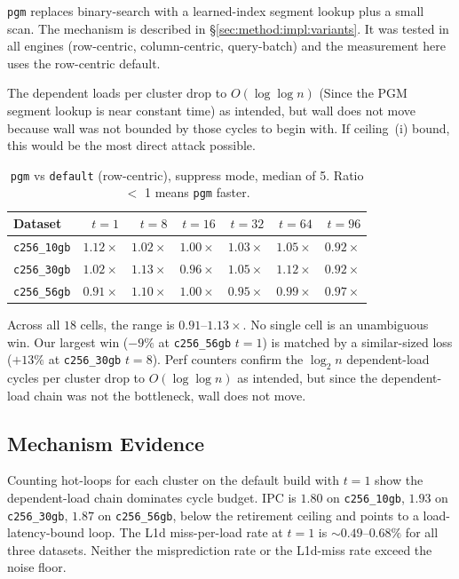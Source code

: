 \texttt{pgm} replaces binary-search with a learned-index segment lookup plus a small scan. The mechanism is described in §\ref{sec:method:impl:variants}. It was tested in all engines (row-centric, column-centric, query-batch) and the measurement here uses the row-centric default.

The dependent loads per cluster drop to $O(\log \log n)$ (Since the PGM segment lookup is near constant time) as intended, but wall does not move because wall was not bounded by those cycles to begin with. If ceiling~(i) bound, this would be the most direct attack possible.

\begin{table}[H]
  \centering
  \caption[\texttt{pgm} vs.\ default.]{\texttt{pgm} vs \texttt{default} (row-centric), suppress mode, median of 5. Ratio $<$ 1 means \texttt{pgm} faster.}
  \label{tab:pgm}
  \begin{tabular}{lrrrrrr}
    \toprule
    Dataset & $t{=}1$ & $t{=}8$ & $t{=}16$ & $t{=}32$ & $t{=}64$ & $t{=}96$ \\
    \midrule
    \texttt{c256\_10gb} & $1.12\times$ & $1.02\times$ & $1.00\times$ & $1.03\times$ & $1.05\times$ & $0.92\times$ \\
    \texttt{c256\_30gb} & $1.02\times$ & $1.13\times$ & $0.96\times$ & $1.05\times$ & $1.12\times$ & $0.92\times$ \\
    \texttt{c256\_56gb} & $0.91\times$ & $1.10\times$ & $1.00\times$ & $0.95\times$ & $0.99\times$ & $0.97\times$ \\
    \bottomrule
  \end{tabular}
\end{table}

Across all $18$ cells, the range is $0.91$--$1.13\times$. No single cell is an unambiguous win. Our largest win ($-9\%$ at \texttt{c256\_56gb} $t=1$) is matched by a similar-sized loss ($+13\%$ at \texttt{c256\_30gb} $t=8$). Perf counters confirm the $\log_2 n$ dependent-load cycles per cluster drop to $O(\log \log n)$ as intended, but since the dependent-load chain was not the bottleneck, wall does not move.

\subsection{Mechanism Evidence\label{sec:exp:c1:mechanism}}

Counting hot-loops for each cluster on the default build with $t=1$ show the dependent-load chain dominates cycle budget. IPC is $1.80$ on \texttt{c256\_10gb}, $1.93$ on \texttt{c256\_30gb}, $1.87$ on \texttt{c256\_56gb}, below the retirement ceiling and points to a load-latency-bound loop. The L1d miss-per-load rate at $t{=}1$ is $\sim\!0.49$--$0.68\%$ for all three datasets. Neither the misprediction rate or the L1d-miss rate exceed the noise floor.


